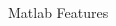 \begin{frame}[fragile]{Matlab Features}
\begin{columns}
\begin{column}{5cm}
\begin{itemize}
      \end{itemize}
    \end{column}
  \end{columns}



\end{frame}





